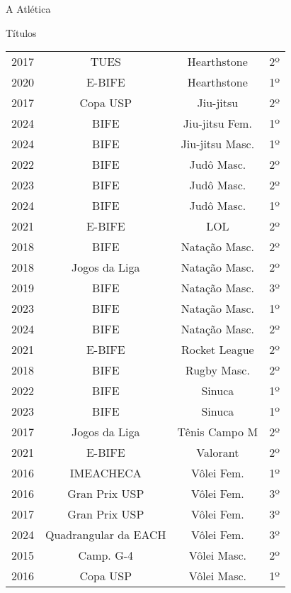\begin{secao}{A Atlética}
\begin{subsecao}{Títulos}
\begin{center}
\begin{tabular}{|c|c|c|c|}
    2017 & TUES           & Hearthstone     & 2º\\
    2020 & E-BIFE         & Hearthstone     & 1º\\
    2017 & Copa USP       & Jiu-jitsu       & 2º\\
    2024 & BIFE           & Jiu-jitsu Fem.  & 1º\\
    2024 & BIFE           & Jiu-jitsu Masc. & 1º\\
    2022 & BIFE           & Judô Masc.      & 2º\\
    2023 & BIFE           & Judô Masc.      & 2º\\
    2024 & BIFE           & Judô Masc.      & 1º\\
    2021 & E-BIFE         & LOL             & 2º\\
    2018 & BIFE           & Natação Masc.   & 2º\\
    2018 & Jogos da Liga  & Natação Masc.   & 2º\\
    2019 & BIFE           & Natação Masc.   & 3º\\
    2023 & BIFE           & Natação Masc.   & 1º\\
    2024 & BIFE           & Natação Masc.   & 2º\\
    2021 & E-BIFE         & Rocket League   & 2º\\
    2018 & BIFE           & Rugby Masc.     & 2º\\
    2022 & BIFE           & Sinuca          & 1º\\
    2023 & BIFE           & Sinuca          & 1º\\
    2017 & Jogos da Liga  & Tênis Campo M   & 2º\\
    2021 & E-BIFE         & Valorant        & 2º\\
    2016 & IMEACHECA      & Vôlei Fem.      & 1º\\
    2016 & Gran Prix USP  & Vôlei Fem.      & 3º\\
    2017 & Gran Prix USP  & Vôlei Fem.      & 3º\\
    2024 & Quadrangular da EACH & Vôlei Fem. & 3º\\
    2015 & Camp. G-4      & Vôlei Masc.     & 2º\\
    2016 & Copa USP       & Vôlei Masc.     & 1º\\
    \hline
         \end{tabular}
\end{center}
\begin{center}
\begin{tabular}{|c|c|c|c|}

\end{tabular}
\end{center}
\end{subsecao}
\end{secao}
